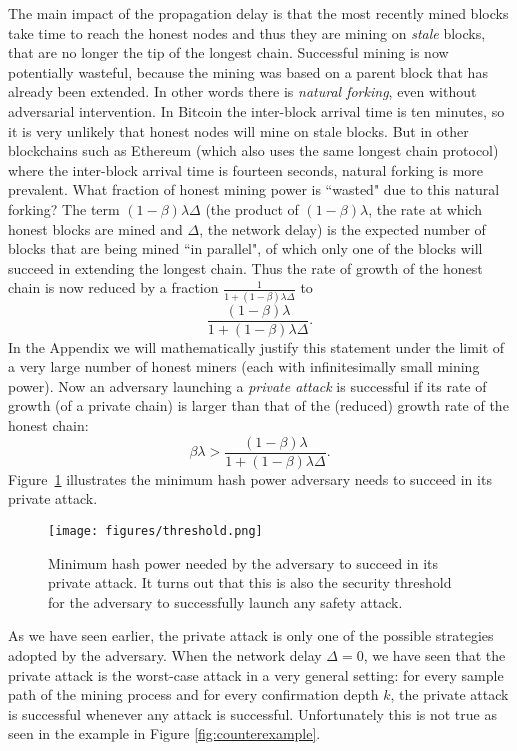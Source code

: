 \documentclass{article}
\newcommand{\pramod}[1]{{\color{red}
\footnotesize[Pramod: #1] }}
\begin{document}
The main impact of the propagation delay is that the most recently mined blocks take time to reach the honest nodes and thus they are mining on {\em stale} blocks, that are no longer the tip of the longest chain. Successful mining is now potentially wasteful, because the mining was based on a parent block that has already been extended. In other words there is {\em natural forking}, even without adversarial intervention. In Bitcoin the inter-block arrival time is ten minutes, so it is very unlikely that honest nodes will mine on stale blocks. But in other blockchains such as Ethereum (which also uses the same longest chain protocol) where the inter-block arrival time is fourteen seconds, natural forking is more prevalent. What fraction of honest mining power is ``wasted" due to this natural forking? The term $(1-\beta) \lambda \Delta$ (the product of $(1-\beta)\lambda$, the rate at which honest blocks are mined and $\Delta$, the network delay) is the expected number of blocks that are being mined ``in parallel", of which only one of the blocks will succeed in extending the longest chain. Thus the rate of growth of the honest chain is now reduced by a fraction $\frac{1}{1 + (1-\beta)\lambda \Delta}$ to 
$$
\frac{(1-\beta)\lambda}{1 + (1-\beta)\lambda \Delta}. 
$$
In the Appendix we will mathematically justify this statement under the limit of a very large number of honest miners (each with infinitesimally small mining power). Now an adversary launching a {\em private attack} is successful if its rate of growth (of a private chain) is larger than that of the (reduced) growth rate of the honest chain:
\begin{equation}
    \beta \lambda > \frac{(1-\beta)\lambda}{1 + (1-\beta)\lambda \Delta}.
    \label{eq:miningthreshold}
\end{equation}
 Figure~\ref{fig:threshold} illustrates the minimum hash power adversary needs  to succeed in its private attack.  %

\begin{figure}
     \centering
     \texttt{[image: figures/threshold.png]}
   \caption{Minimum hash power needed by the adversary to succeed in its private attack. It turns out that this is also the security threshold for the adversary to successfully launch any safety attack. }
   \label{fig:threshold}
 \end{figure}

As we have seen earlier, the private attack is only one of the possible strategies adopted by the adversary. When the network delay $\Delta =0$, we have seen that the private attack is the worst-case attack in a very general setting: for every sample path of the mining process and for every confirmation depth $k$, the private attack is successful whenever any attack is successful. Unfortunately this is not true as seen in the example in Figure \ref{fig:counterexample}. 
\end{document}
